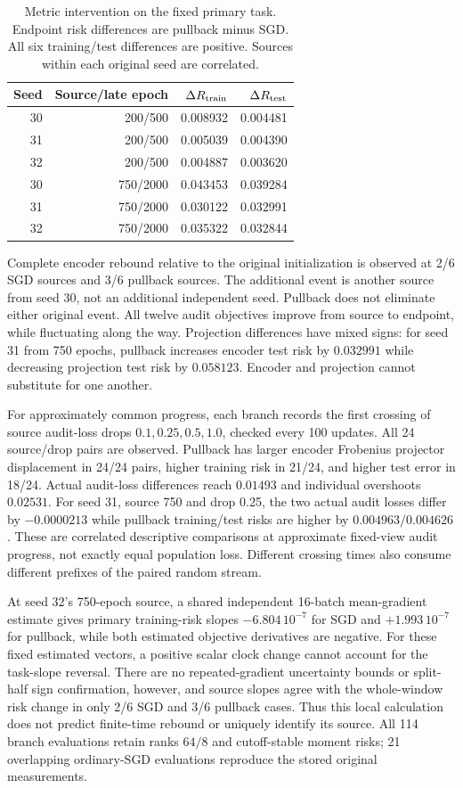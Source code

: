 \begin{table}[t]
\centering\small
\caption{Metric intervention on the fixed primary task. Endpoint risk differences are pullback minus SGD. All six training/test differences are positive. Sources within each original seed are correlated.}
\label{supp:followup-metric}
\setlength{\tabcolsep}{4pt}
\begin{tabular}{rrrr}
\toprule
Seed&Source/late epoch&$\Delta R_{\rm train}$&$\Delta R_{\rm test}$\\\midrule
30&200/500&0.008932&0.004481\\
31&200/500&0.005039&0.004390\\
32&200/500&0.004887&0.003620\\
30&750/2000&0.043453&0.039284\\
31&750/2000&0.030122&0.032991\\
32&750/2000&0.035322&0.032844\\\bottomrule
\end{tabular}
\end{table}

Complete encoder rebound relative to the original initialization is observed at 2/6 SGD sources and 3/6 pullback sources. The additional event is another source from seed 30, not an additional independent seed. Pullback does not eliminate either original event. All twelve audit objectives improve from source to endpoint, while fluctuating along the way. Projection differences have mixed signs: for seed 31 from 750 epochs, pullback increases encoder test risk by $0.032991$ while decreasing projection test risk by $0.058123$. Encoder and projection cannot substitute for one another.

For approximately common progress, each branch records the first crossing of source audit-loss drops $0.1,0.25,0.5,1.0$, checked every 100 updates. All 24 source/drop pairs are observed. Pullback has larger encoder Frobenius projector displacement in 24/24 pairs, higher training risk in 21/24, and higher test error in 18/24. Actual audit-loss differences reach $0.01493$ and individual overshoots $0.02531$. For seed 31, source 750 and drop 0.25, the two actual audit losses differ by $-0.0000213$ while pullback training/test risks are higher by $0.004963/0.004626$. These are correlated descriptive comparisons at approximate fixed-view audit progress, not exactly equal population loss. Different crossing times also consume different prefixes of the paired random stream.

At seed 32's 750-epoch source, a shared independent 16-batch mean-gradient estimate gives primary training-risk slopes $-6.804\,10^{-7}$ for SGD and $+1.993\,10^{-7}$ for pullback, while both estimated objective derivatives are negative. For these fixed estimated vectors, a positive scalar clock change cannot account for the task-slope reversal. There are no repeated-gradient uncertainty bounds or split-half sign confirmation, however, and source slopes agree with the whole-window risk change in only 2/6 SGD and 3/6 pullback cases. Thus this local calculation does not predict finite-time rebound or uniquely identify its source. All 114 branch evaluations retain ranks $64/8$ and cutoff-stable moment risks; 21 overlapping ordinary-SGD evaluations reproduce the stored original measurements.

